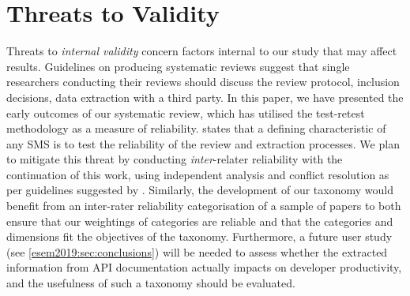

 
\section{Threats to Validity}
\label{esem2019:sec:limitations}

Threats to \textit{internal validity} concern factors internal to our study that may affect results. Guidelines on producing systematic reviews \citep{Kitchenham:2007dd} suggest that single researchers conducting their reviews should discuss the review protocol, inclusion decisions, data extraction with a third party. In this paper, we have presented the early outcomes of our systematic review, which has utilised the test-retest methodology as a measure of reliability. \citet{5416726} states that a defining characteristic of any SMS is to test the reliability of the review and extraction processes. We plan to mitigate this threat by conducting \textit{inter}-relater reliability with the continuation of this work, using independent analysis and conflict resolution as per guidelines suggested by \citet{Garousi:2017:EGE:3084226.3084238}. Similarly, the development of our taxonomy would benefit from an inter-rater reliability categorisation of a sample of papers to both ensure that our weightings of categories are reliable and that the categories and dimensions fit the objectives of the taxonomy. Furthermore, a future user study (see \cref{esem2019:sec:conclusions}) will be needed to assess whether the extracted information from API documentation actually impacts on developer productivity, and the usefulness of such a taxonomy should be evaluated.


